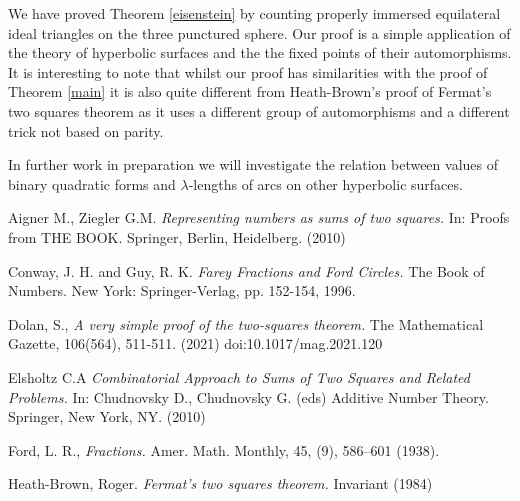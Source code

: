 \documentclass[12pt]{amsart}
\theoremstyle{plain}
\theoremstyle{definition}
\begin{document}
We have proved Theorem \ref{eisenstein} by counting properly
immersed equilateral ideal triangles on the three punctured sphere.
Our proof is a simple application of the theory of hyperbolic
surfaces and the the fixed points of their automorphisms.
It is interesting to note that whilst our proof has similarities
with the proof of Theorem \ref{main} it is also quite different from
Heath-Brown's proof of Fermat's two squares theorem \cite{heath} as
it uses a different group of automorphisms and a different trick not
based on parity.


In further work in preparation we will investigate the relation  between values of
binary quadratic forms and $\lambda$-lengths of arcs
on other hyperbolic surfaces.


Aigner M., Ziegler G.M.  
\textit{Representing numbers as sums of two squares.} In: Proofs from THE BOOK. Springer, Berlin, Heidelberg. (2010)

Conway, J. H. and Guy, R. K. \textit{Farey Fractions and Ford
Circles.} The Book of Numbers. New York: Springer-Verlag, pp. 152-154, 1996.

Dolan, S., 
\textit{A very simple proof of the two-squares theorem.}
The Mathematical Gazette, 106(564), 511-511. (2021) doi:10.1017/mag.2021.120

Elsholtz C.A 
\textit{Combinatorial Approach to Sums of Two Squares and Related Problems.}
 In: Chudnovsky D., Chudnovsky G. (eds) Additive Number Theory. Springer, New York, NY.
 (2010) 


Ford, L. R.,  \textit{Fractions.} Amer. Math. Monthly, 45, (9), 586–601 (1938).



%



Heath-Brown, Roger. 
\textit{ Fermat’s two squares theorem.} Invariant (1984) 

\end{document}
